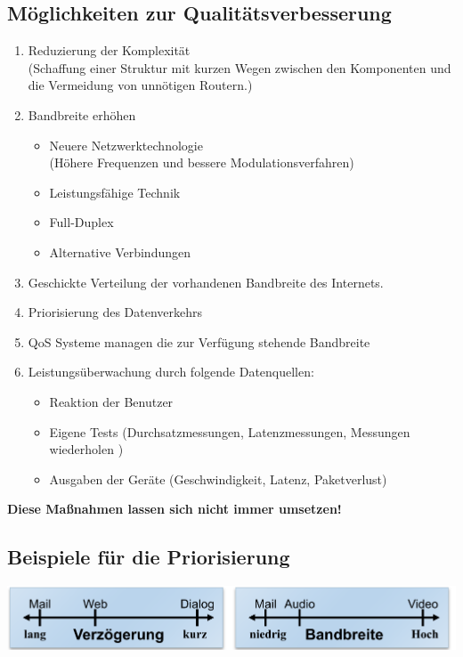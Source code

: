 \documentclass{article} %
\begin{document}
\subsection{Möglichkeiten zur Qualitätsverbesserung}
	\begin{enumerate}
	\item Reduzierung der Komplexität\\
	(Schaffung einer Struktur mit kurzen Wegen zwischen den Komponenten und die Vermeidung von unnötigen Routern.)
	\item Bandbreite erhöhen
		\begin{itemize}
		\item Neuere Netzwerktechnologie\\
		(Höhere Frequenzen und bessere Modulationsverfahren)
		\item Leistungsfähige Technik
		\item Full-Duplex
		\item Alternative Verbindungen
		\end{itemize}
	\item Geschickte Verteilung der vorhandenen Bandbreite des Internets.
	\item Priorisierung des Datenverkehrs
	\item QoS Systeme managen die zur Verfügung stehende Bandbreite
	\item Leistungsüberwachung durch folgende Datenquellen:
		\begin{itemize}
		\item Reaktion der Benutzer
		\item Eigene Tests (Durchsatzmessungen, Latenzmessungen, Messungen wiederholen )
		\item Ausgaben der Geräte (Geschwindigkeit, Latenz, Paketverlust)
		\end{itemize}
	\end{enumerate}
\textbf{Diese Maßnahmen lassen sich nicht immer umsetzen!}

\subsection{Beispiele für die Priorisierung}
\begin{center}
	\includegraphics[width=15cm]{img/prio.png}
\end{center}
\end{document}
